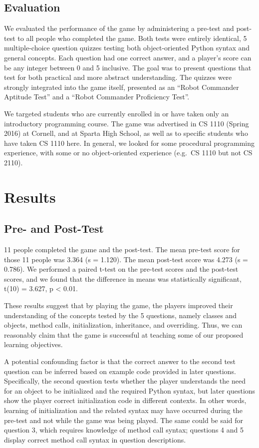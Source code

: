 \documentclass[12pt,notitlepage]{article}
\begin{document}
\subsection{Evaluation}

We evaluated the performance of the game by administering a pre-test
and post-test to all people who completed the game. Both tests were
entirely identical, 5 multiple-choice question quizzes testing both
object-oriented Python syntax and general concepts. Each question had
one correct answer, and a player's score can be any integer between
0 and 5 inclusive. The goal was to present questions that test for both
practical and more abstract understanding. The quizzes were strongly
integrated into the game itself, presented as an
``Robot Commander Aptitude Test'' and a ``Robot Commander Proficiency
Test''.

We targeted students who are currently enrolled in or have taken only
an introductory programming course. The game was advertised in CS 1110
(Spring 2016) at Cornell, and at Sparta High School, as well as
to specific students who have taken CS 1110 here. In general, we
looked for some procedural programming experience, with some or no
object-oriented experience (e.g.\ CS 1110 but not CS 2110).

\section{Results}

\subsection{Pre- and Post-Test}

11 people completed the game and the post-test. The mean pre-test score
for those 11 people was 3.364 (s = 1.120). The mean post-test score was
4.273 (s = 0.786). We performed a paired t-test on the pre-test scores and
the post-test scores, and we found that the difference in means was
statistically significant, t(10) = 3.627, p < 0.01.

These results suggest that by playing the game, the players improved their
understanding of the concepts tested by the 5 questions, namely classes and
objects, method calls, initialization, inheritance, and overriding. Thus, we
can reasonably claim that the game is successful at teaching some of our
proposed learning objectives.

A potential confounding factor is that the correct answer to the second
test question can be inferred based on example code provided in later
questions. Specifically, the second question tests whether the player
understands the need for an object to be initialized and the required Python
syntax, but later questions show the player correct initialization code in
different contexts. In other words, learning of initialization and the related
syntax may have occurred during the pre-test and not while the game was being
played. The same could be said for question 3, which requires knowledge of
method call syntax; questions 4 and 5 display correct method call syntax in
question descriptions.
\end{document}
